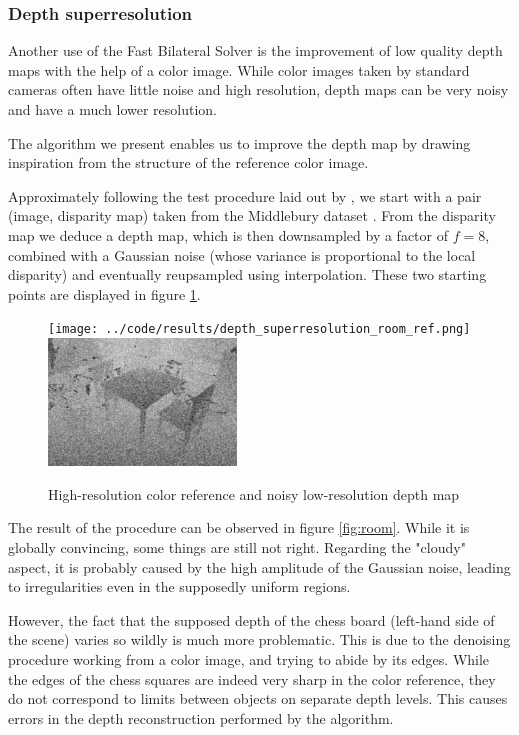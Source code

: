 \documentclass{article}
\begin{document}
\subsubsection{Depth superresolution}

Another use of the Fast Bilateral Solver is the improvement of low quality depth maps with the help of a color image. While color images taken by standard cameras often have little noise and high resolution, depth maps can be very noisy and have a much lower resolution.

The algorithm we present enables us to improve the depth map by drawing inspiration from the structure of the reference color image.

\medskip

Approximately following the test procedure laid out by \cite{ferstl_image_2013}, we start with a pair (image, disparity map) taken from the Middlebury dataset \cite{jiang_high-resolution_2014}. From the disparity map we deduce a depth map, which is then downsampled by a factor of $f=8$, combined with a Gaussian noise (whose variance is proportional to the local disparity) and eventually reupsampled using interpolation. These two starting points are displayed in figure \ref{fig:room_original}.

\begin{figure}
    \centering
    \texttt{[image: ../code/results/depth\_superresolution\_room\_ref.png]}
    \includegraphics[width=5cm]{../code/results/depth_superresolution_room_target.png}
    \caption{High-resolution color reference and noisy low-resolution depth map}
    \label{fig:room_original}
\end{figure}

\medskip

The result of the procedure can be observed in figure \ref{fig:room}. While it is globally convincing, some things are still not right. Regarding the "cloudy" aspect, it is probably caused by the high amplitude of the Gaussian noise, leading to irregularities even in the supposedly uniform regions.

However, the fact that the supposed depth of the chess board (left-hand side of the scene) varies so wildly is much more problematic. This is due to the denoising procedure working from a color image, and trying to abide by its edges. While the edges of the chess squares are indeed very sharp in the color reference, they do not correspond to limits between objects on separate depth levels. This causes errors in the depth reconstruction performed by the algorithm.
\end{document}
